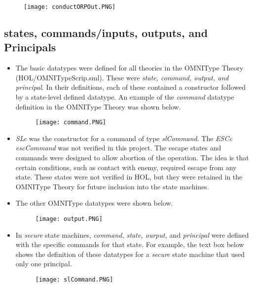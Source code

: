   \begin{figure}[h]
  \centering
  \texttt{[image: conductORPOut.PNG]}
\end{figure}


\subsection{states, commands/inputs, outputs, and Principals}
\label{sec:stat-comm-outp}


\begin{itemize}
  \item The basic datatypes were defined for all theories in the OMNIType Theory (HOL/OMNITypeScrip.sml).
  These were \textit{state, command, output, and principal}.   In their definitions, each of these
  contained a constructor followed by a state-level defined datatype.   An example of the
  \textit{command} datatype definition in the OMNIType Theory was shown below.\\
  
  \begin{figure}[h]
  \centering
  \texttt{[image: command.PNG]}
\end{figure}

 \item \textit{SLc} was the constructor for a command of type \textit{slCommand}.  The \textit{ESCc escCommand}
  was not verified in this project.  The escape states and commands were designed to allow abortion of the
  operation.  The idea is that certain conditions, such as contact with enemy, required escape from any state.
  These states were not verified in HOL, but they were retained in the OMNIType Theory for future inclusion
  into the state machines.\\
  
  \item The other OMNIType datatypes were shown below.\\
  
  \begin{figure}[h]
  \centering
  \texttt{[image: output.PNG]}
\end{figure}

 \item In \textit{secure} state machines, \textit{command, state, ourput,} and \textit{principal}
  were defined with the specific commands for that state.  For example, the text box below shows
  the definition of these datatypes for a \textit{secure} state machine that used only one principal.
  \begin{figure}[h]
  \centering
  \texttt{[image: slCommand.PNG]}
\end{figure}


\end{itemize}
